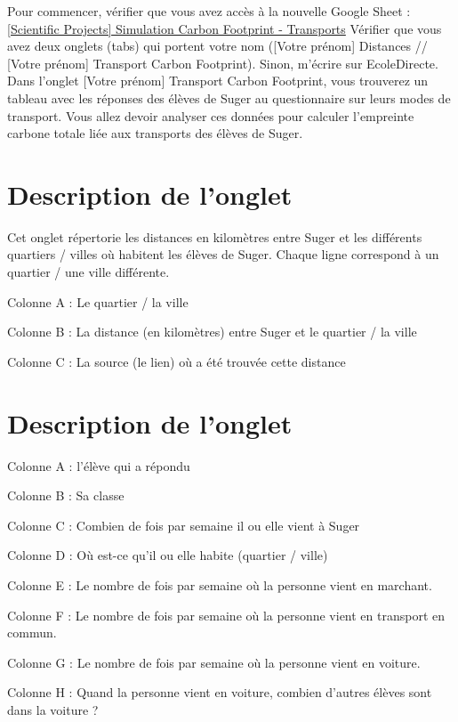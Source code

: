 \documentclass{exam}
\begin{document}
\begin{questions}

  \question Pour commencer, vérifier que vous avez accès à la nouvelle Google Sheet : \href{https://docs.google.com/spreadsheets/d/10JpgvZLnFr1NgJSxFhcqqPTsROaDkTe5g9hyvtTZHqY/edit?gid=490343518#gid=490343518}{[Scientific Projects] Simulation Carbon Footprint - Transports}
   \question Vérifier que vous avez deux onglets (tabs) qui portent votre nom ([Votre prénom] Distances // [Votre prénom] Transport Carbon Footprint). Sinon, m'écrire sur EcoleDirecte. Dans l'onglet [Votre prénom] Transport Carbon Footprint, vous trouverez un tableau avec les réponses des élèves de Suger au questionnaire sur leurs modes de transport. Vous allez devoir analyser ces données pour calculer l'empreinte carbone totale liée aux transports des élèves de Suger.
\end{questions}

\section{Description de l'onglet }

Cet onglet répertorie les distances en kilomètres entre Suger et les différents quartiers / villes où habitent les élèves de Suger. Chaque ligne correspond à un quartier / une ville différente.
\begin{compactitem}
  \item Colonne A : Le quartier / la ville
  \item Colonne B : La distance (en kilomètres) entre Suger et le quartier / la ville
  \item Colonne C : La source (le lien) où a été trouvée cette distance 
\end{compactitem}

\section{Description de l'onglet }

\begin{compactitem}
  \item Colonne A : l'élève qui a répondu
  \item Colonne B : Sa classe
  \item Colonne C : Combien de fois par semaine il ou elle vient à Suger 
  \item Colonne D : Où est-ce qu'il ou elle habite (quartier / ville)
  \item Colonne E : Le nombre de fois par semaine où la personne vient en marchant.
  \item Colonne F : Le nombre de fois par semaine où la personne vient en transport en commun.
  \item Colonne G : Le nombre de fois par semaine où la personne vient en voiture.
  \item Colonne H : Quand la personne vient en voiture, combien d'autres élèves sont dans la voiture ? 
\end{compactitem}
\end{document}
